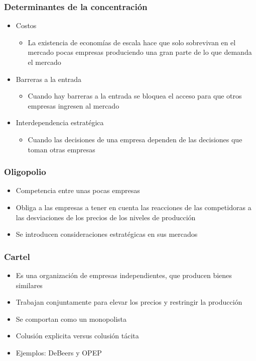 \documentclass{beamer}
\begin{document}
\begin{frame}
\frametitle{ Determinantes de la concentración}
\begin{itemize}
    \item Costos
        \begin{itemize}
        \item La existencia de economías de escala hace que solo sobrevivan en el mercado pocas empresas produciendo una gran parte de lo que demanda el mercado 
        \end{itemize}
    \vspace{2mm}
    \item Barreras a la entrada 
        \begin{itemize}
        \item Cuando hay barreras a la entrada se bloquea el acceso para que otros empresas ingresen al mercado
        \end{itemize}
    \vspace{2mm}
    \item Interdependencia estratégica
        \begin{itemize}
        \item Cuando las decisiones de una empresa dependen de las decisiones que toman otras empresas 
        \end{itemize}
    \end{itemize}
\end{frame}

\begin{frame}
\frametitle{Oligopolio}
\begin{itemize}
    \item Competencia entre unas pocas empresas 
    \item Obliga a las empresas a tener en cuenta las reacciones de las competidoras a las desviaciones de los precios de los niveles de producción
    \item Se introducen consideraciones estratégicas en sus mercados
\end{itemize}
\end{frame}

\begin{frame}
\frametitle{ Cartel}
\begin{itemize}
    \item Es una organización de empresas independientes, que producen bienes similares
    \item Trabajan conjuntamente para elevar los precios y restringir la producción
    \item Se comportan como un monopolista
    \item Colusión explicita versus colusión tácita
    \item Ejemplos: DeBeers y OPEP
    \end{itemize}
\end{frame}
\end{document}
